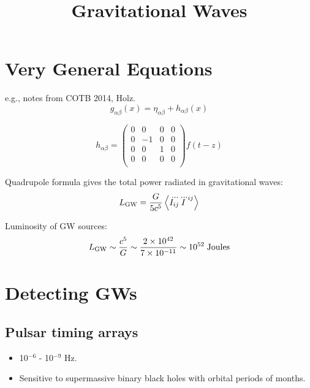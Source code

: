 \documentclass[11pt,a4paper]{article}
\begin{document}
\title{Gravitational Waves}
\maketitle



\section{Very General Equations}
e.g., notes from COTB 2014, Holz. \\


\begin{equation}
  g_{\alpha \beta}(x) = \eta_{\alpha \beta} + h_{\alpha \beta}(x)
\end{equation}

\begin{equation}
h_{\alpha \beta} = \begin{pmatrix}
                                0  &    0  & 0  & 0  \\ 
                                0  &  -1   & 0  & 0   \\ 
                                0  &    0  & 1  & 0  \\ 
                                0  &    0   & 0  & 0   \\ 
                         \end{pmatrix}
f(t-z)
\end{equation}

\noindent
Quadrupole formula gives the total power radiated in gravitational waves:
\begin{equation}
L_{\rm GW}  =  \frac{G}{5c^5} \left \langle  \dddot{I_{ij}} \dddot{I}^{ij} \right \rangle 
\end{equation}

\noindent
Luminosity of GW sources:
\begin{equation}
 L_{\rm GW} \sim \frac{c^5}{G} \sim \frac{2\times 10^{42}} {7\times 10^{-11}} \sim 10^{52} \;  {\rm Joules}
\end{equation}



\section{Detecting GWs}

\subsection{Pulsar timing arrays }
\begin{itemize}
\item  10$^{-6}$ - 10$^{-9}$ Hz. 
\item  Sensitive to supermassive binary black holes with orbital periods of months. 
\end{itemize}
\end{document}
